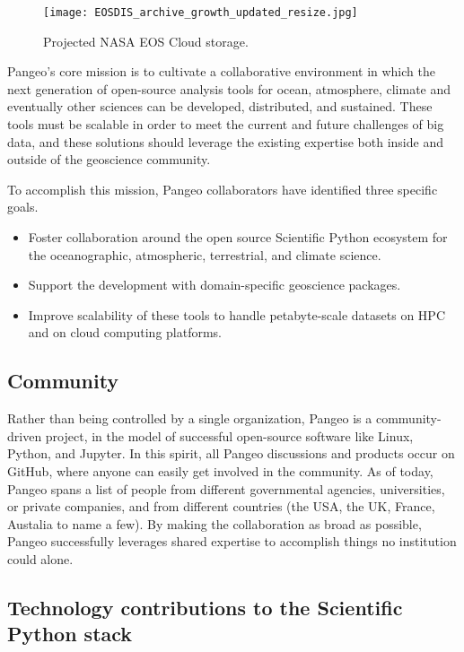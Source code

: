 \documentclass{article}
\begin{document}
\begin{figure}
  \centering
  \texttt{[image: EOSDIS\_archive\_growth\_updated\_resize.jpg]}
  \caption{\label{nasa_cloud_growth} Projected NASA EOS Cloud storage\cite{b2}.}
\end{figure}


Pangeo's core mission is to cultivate a collaborative environment in which the
next generation of open-source analysis tools for ocean, atmosphere, climate and
eventually other sciences can be developed, distributed, and sustained. These
tools must be scalable in order to meet the current and future challenges of big
data, and these solutions should leverage the existing expertise both inside and
outside of the geoscience community.

To accomplish this mission, Pangeo collaborators have identified three specific
goals.
\begin{itemize}
\item Foster collaboration around the open source Scientific Python ecosystem for the oceanographic, atmospheric, terrestrial, and climate science.
\item Support the development with domain-specific geoscience packages.
\item Improve scalability of these tools to handle petabyte-scale datasets on HPC and on cloud computing platforms.
\end{itemize}

\subsection{Community}
\label{ssec:community}

Rather than being controlled by a single organization, Pangeo is a
community-driven project, in the model of successful open-source software like
Linux, Python, and Jupyter.  In this spirit, all Pangeo discussions and products
occur on GitHub\cite{b3}, where anyone can easily get involved in the community.
As of today, Pangeo spans a list of people from different governmental agencies,
universities, or private companies, and from different countries (the USA, the
UK, France, Austalia to name a few).  By making the collaboration as broad as
possible, Pangeo successfully leverages shared expertise to accomplish things no
institution could alone.


\subsection{Technology contributions to the Scientific Python stack}
\label{ssec:techstack}
\end{document}
